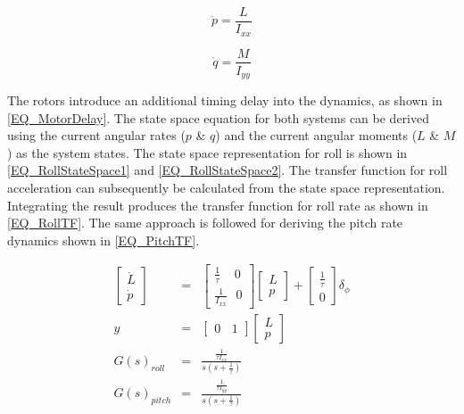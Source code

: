 	\begin{equation}
	\label{EQ_RollNewton}
	\dot{p} = \dfrac{L}{I_{xx}}
	\end{equation}
	
	\begin{equation}
	\label{EQ_PitchNewton}
	\dot{q} = \dfrac{M}{I_{yy}}
	\end{equation}
	
	The rotors introduce an additional timing delay into the dynamics, as shown in \eqref{EQ_MotorDelay}. The state space equation for both systems can be derived using the current angular rates ($p$ \& $q$) and the current angular moments ($L$ \& $M$) as the system states. The state space representation for roll is shown in \eqref{EQ_RollStateSpace1} and \eqref{EQ_RollStateSpace2}. The transfer function for roll acceleration can subsequently be calculated from the state space representation. Integrating the result produces the transfer function for roll rate as shown in \eqref{EQ_RollTF}. The same approach is followed for deriving the pitch rate dynamics shown in \ref{EQ_PitchTF}.
	
	\begin{eqnarray}
	\begin{bmatrix} \dot{L} \\ \dot{p}	\end{bmatrix}&=&\begin{bmatrix}\frac{1}{\tau}\ \ \ \ \ 0\\\frac{1}{I_{xx}} \ \ \ 0 \end{bmatrix} \begin{bmatrix} L \\ p \end{bmatrix} + \begin{bmatrix}\frac{1}{\tau}\\ 0 \end{bmatrix} \delta_\phi\label{EQ_RollStateSpace1}\\\label{EQ_RollStateSpace11} 
	y &=& \begin{bmatrix} 0 \ \ \ \ 1 \end{bmatrix} \begin{bmatrix} L \\ p \end{bmatrix} \label{EQ_RollStateSpace2}\\
	G(s)_{roll} &=& \frac{\frac{1}{\tau I_{xx}}}{s (s + \frac{1}{\tau})}\label{EQ_RollTF}\\
	G(s)_{pitch} &=& \frac{\frac{1}{\tau I_{yy}}}{s (s + \frac{1}{\tau})}\label{EQ_PitchTF}
	\end{eqnarray}
	
